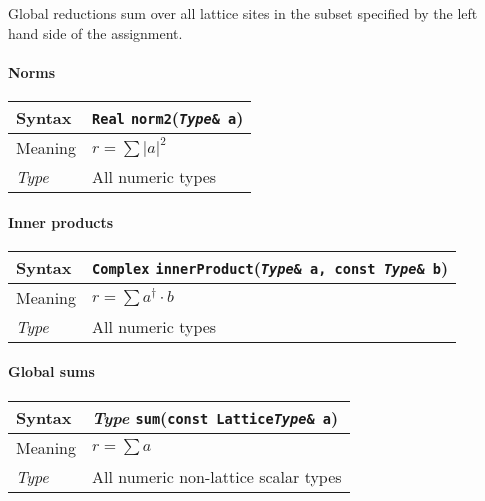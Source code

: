 \documentclass[12pt,letterpaper]{article}
\newcommand{\tReal}{Real}
\newcommand{\tComplex}{Complex}
\newcommand{\allNumericTypes}{All numeric types}
\newcommand{\itt}{\it Type}
\begin{document}
Global reductions sum over all lattice sites in the subset specified by 
the left hand side of the assignment.

\paragraph{Norms}

\begin{flushleft}
  \begin{tabular}{|l|l|}
  \hline
  Syntax      & {\tt \tReal} \verb|norm2|({\tt {\it Type}\& a})\\
  \hline
  Meaning     & $r = \sum |a|^2$ \\
  \hline
  \itt        & \allNumericTypes \\
  \hline
  \end{tabular}
\end{flushleft}

\paragraph{Inner products}

\begin{flushleft}
  \begin{tabular}{|l|l|}
  \hline
  Syntax      & {\tt \tComplex} \verb|innerProduct|({\tt {\it Type}\& a, const {\it Type}\& b})\\
  \hline
  Meaning     & $r = \sum a^\dagger \cdot b$ \\
  \hline
  \itt        & \allNumericTypes \\
  \hline
  \end{tabular}
\end{flushleft}


\paragraph{Global sums}

\begin{flushleft}
  \begin{tabular}{|l|l|}
  \hline
  Syntax      & {\it Type} \verb|sum|({\tt const Lattice{\it Type}\& a})\\
  \hline
  Meaning     & $r = \sum a$\\
  \hline
  \itt     & All numeric non-lattice scalar types \\
  \hline
  \end{tabular}
\end{flushleft}
\end{document}

